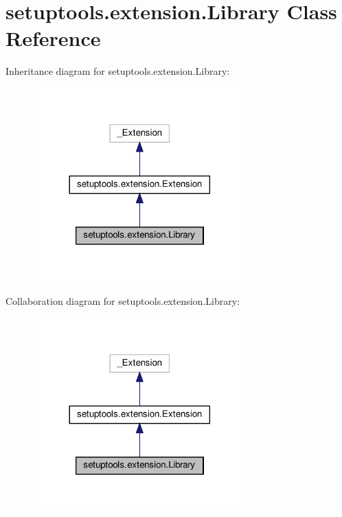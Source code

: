 \hypertarget{classsetuptools_1_1extension_1_1Library}{}\section{setuptools.\+extension.\+Library Class Reference}
\label{classsetuptools_1_1extension_1_1Library}


Inheritance diagram for setuptools.\+extension.\+Library\+:
\nopagebreak
\begin{figure}[H]
\begin{center}
\leavevmode
\includegraphics[width=233pt]{classsetuptools_1_1extension_1_1Library__inherit__graph}
\end{center}
\end{figure}


Collaboration diagram for setuptools.\+extension.\+Library\+:
\nopagebreak
\begin{figure}[H]
\begin{center}
\leavevmode
\includegraphics[width=233pt]{classsetuptools_1_1extension_1_1Library__coll__graph}
\end{center}
\end{figure}
